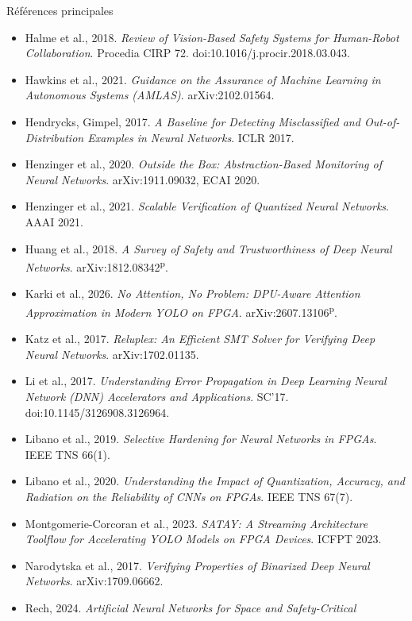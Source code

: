 \documentclass[aspectratio=169,11pt]{beamer}
\newcommand{\pre}{\textsuperscript{\color{acc}p}}
\begin{document}
\begin{frame}[allowframebreaks]{Références principales}
\begin{itemize}
{          Detection on PYNQ-Z1 Using FINN}. arXiv:2609.24757\pre.
    \item Halme et al., 2018. \textit{Review of Vision-Based Safety Systems for Human-Robot
          Collaboration}. Procedia CIRP 72. doi:10.1016/j.procir.2018.03.043.
    \item Hawkins et al., 2021. \textit{Guidance on the Assurance of Machine Learning in
          Autonomous Systems (AMLAS)}. arXiv:2102.01564.
    \item Hendrycks, Gimpel, 2017. \textit{A Baseline for Detecting Misclassified and
          Out-of-Distribution Examples in Neural Networks}. ICLR 2017.
    \item Henzinger et al., 2020. \textit{Outside the Box: Abstraction-Based Monitoring of
          Neural Networks}. arXiv:1911.09032, ECAI 2020.
    \item Henzinger et al., 2021. \textit{Scalable Verification of Quantized Neural
          Networks}. AAAI 2021.
    \item Huang et al., 2018. \textit{A Survey of Safety and Trustworthiness of Deep Neural
          Networks}. arXiv:1812.08342\pre.
    \item Karki et al., 2026. \textit{No Attention, No Problem: DPU-Aware Attention
          Approximation in Modern YOLO on FPGA}. arXiv:2607.13106\pre.
    \item Katz et al., 2017. \textit{Reluplex: An Efficient SMT Solver for Verifying Deep
          Neural Networks}. arXiv:1702.01135.
    \item Li et al., 2017. \textit{Understanding Error Propagation in Deep Learning Neural
          Network (DNN) Accelerators and Applications}. SC'17.
          doi:10.1145/3126908.3126964.
    \item Libano et al., 2019. \textit{Selective Hardening for Neural Networks in FPGAs}.
          IEEE TNS 66(1).
    \item Libano et al., 2020. \textit{Understanding the Impact of Quantization, Accuracy,
          and Radiation on the Reliability of CNNs on FPGAs}. IEEE TNS 67(7).
    \item Montgomerie-Corcoran et al., 2023. \textit{SATAY: A Streaming Architecture Toolflow
          for Accelerating YOLO Models on FPGA Devices}. ICFPT 2023.
    \item Narodytska et al., 2017. \textit{Verifying Properties of Binarized Deep Neural
          Networks}. arXiv:1709.06662.
    \item Rech, 2024. \textit{Artificial Neural Networks for Space and Safety-Critical
}
\end{itemize}
\end{frame}
\end{document}
